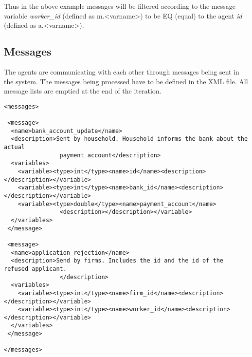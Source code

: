 Thus in the above example messages will be filtered according to the
message variable \emph{worker\_id} (defined as m.<varname>) to be EQ
(equal) to the agent \emph{id} (defined as a.<varname>).

\subsection{Messages}

The agents are communicating with each other through messages being
sent in the system. The messages being processed have to be defined
in the XML file. All message lists are emptied at the end of the
iteration.

\begin{mylisting}
\begin{verbatim}
<messages>

 <message>
  <name>bank_account_update</name>
  <description>Sent by household. Household informs the bank about the actual
                payment account</description>
  <variables>
    <variable><type>int</type><name>id</name><description></description></variable>
    <variable><type>int</type><name>bank_id</name><description></description></variable>
    <variable><type>double</type><name>payment_account</name>
                <description></description></variable>
  </variables>
 </message>

 <message>
  <name>application_rejection</name>
  <description>Send by firms. Includes the id and the id of the refused applicant.
                </description>
  <variables>
    <variable><type>int</type><name>firm_id</name><description></description></variable>
    <variable><type>int</type><name>worker_id</name><description></description></variable>
  </variables>
 </message>

</messages>
\end{verbatim}
\end{mylisting}
